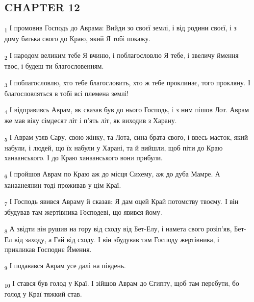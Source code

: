 \subsection{CHAPTER 12}
\begin{tcolorbox}
\textsubscript{1} І промовив Господь до Аврама: Вийди зо своєї землі, і від родини своєї, і з дому батька свого до Краю, який Я тобі покажу.
\end{tcolorbox}
\begin{tcolorbox}
\textsubscript{2} І народом великим тебе Я вчиню, і поблагословлю Я тебе, і звеличу ймення твоє, і будеш ти благословенням.
\end{tcolorbox}
\begin{tcolorbox}
\textsubscript{3} І поблагословлю, хто тебе благословить, хто ж тебе проклинає, того прокляну. І благословляться в тобі всі племена землі!
\end{tcolorbox}
\begin{tcolorbox}
\textsubscript{4} І відправивсь Аврам, як сказав був до нього Господь, і з ним пішов Лот. Аврам же мав віку сімдесят літ і п'ять літ, як виходив з Харану.
\end{tcolorbox}
\begin{tcolorbox}
\textsubscript{5} І Аврам узяв Сару, свою жінку, та Лота, сина брата свого, і ввесь маєток, який набули, і людей, що їх набули у Харані, та й вийшли, щоб піти до Краю ханаанського. І до Краю ханаанського вони прибули.
\end{tcolorbox}
\begin{tcolorbox}
\textsubscript{6} І пройшов Аврам по Краю аж до місця Сихему, аж до дуба Мамре. А ханаанеянин тоді проживав у цім Краї.
\end{tcolorbox}
\begin{tcolorbox}
\textsubscript{7} І Господь явився Авраму й сказав: Я дам оцей Край потомству твоєму. І він збудував там жертівника Господеві, що явився йому.
\end{tcolorbox}
\begin{tcolorbox}
\textsubscript{8} А звідти він рушив на гору від сходу від Бет-Елу, і намета свого розіп'яв, Бет-Ел від заходу, а Гай від сходу. І він збудував там Господу жертівника, і прикликав Господнє Ймення.
\end{tcolorbox}
\begin{tcolorbox}
\textsubscript{9} І подавався Аврам усе далі на південь.
\end{tcolorbox}
\begin{tcolorbox}
\textsubscript{10} І стався був голод у Краї. І зійшов Аврам до Єгипту, щоб там перебути, бо голод у Краї тяжкий став.
\end{tcolorbox}
